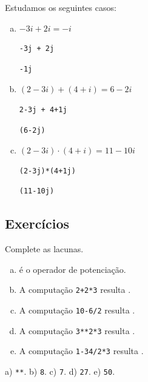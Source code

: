 \begin{ex}
  Estudamos os seguintes casos:
  \begin{enumerate}[a)]
  \item $-3i + 2i = -i$

\begin{lstlisting}[framexrightmargin=-1.5em]
-3j + 2j
\end{lstlisting}

\begin{verbatim}
-1j
\end{verbatim}

  \item $(2 - 3i) + (4 + i) = 6 -2i$

\begin{lstlisting}[framexrightmargin=-1.5em]
2-3j + 4+1j
\end{lstlisting}

\begin{verbatim}
(6-2j)
\end{verbatim}

  \item $(2 - 3i)\cdot (4 + i) = 11 - 10i$

\begin{lstlisting}[framexrightmargin=-1.5em]
(2-3j)*(4+1j)
\end{lstlisting}

\begin{verbatim}
(11-10j)
\end{verbatim}

\end{enumerate}

\end{ex}

\subsection{Exercícios}

\begin{exer}
  Complete as lacunas.
  \begin{enumerate}[a)]
    \item \underline{\phantom{\texttt{**}}} é o operador de potenciação.
    \item A computação \texttt{2+2*3} resulta \underline{}.
    \item A computação \texttt{10-6/2} resulta \underline{}.
    \item A computação \texttt{3**2*3} resulta \underline{}.
    \item A computação \texttt{1-34/2*3} resulta \underline{}.
  \end{enumerate}
\end{exer}
\begin{resp}
  a) \texttt{**}. b) \texttt{8}. c) \texttt{7}. d) \texttt{27}. e) \texttt{50}.
\end{resp}

